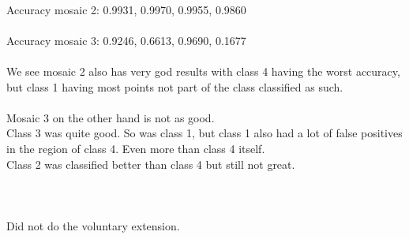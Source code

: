 \documentclass[12pt, letterpaper, twoside]{article}
\begin{document}
\ \\
Accuracy mosaic 2: 0.9931, 0.9970, 0.9955, 0.9860\\
\ \\
Accuracy mosaic 3: 0.9246, 0.6613, 0.9690, 0.1677\\
\newpage
\ \\
We see mosaic 2 also has very god results with class 4 having the worst accuracy, but class 1 having most points not part of the class classified as such.\\
\ \\
Mosaic 3 on the other hand is not as good.\\
Class 3 was quite good. So was class 1, but class 1 also had a lot of false positives in the region of class 4. Even more than class 4 itself.\\
Class 2 was classified better than class 4 but still not great.\\
\ \\
\ \\
\ \\
Did not do the voluntary extension. 
\end{document}
